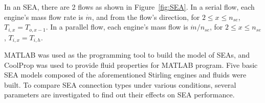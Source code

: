 In an SEA, there are 2 flows as shown in Figure~\ref{fig:SEA}. In a serial flow, each engine's mass flow rate is $\dot{m}$, and from the flow's direction, for $2\leqslant{}x\leqslant{}n_{se}$, $T_{i,x} = T_{o,x-1}$. In a parallel flow, each engine's mass flow is $\dot{m}/n_{se}$, for $2\leqslant{}x\leqslant{}n_{se}$, $T_{i,x} = T_{i,h}$.




MATLAB was used as the programming tool to build the model of SEAs, and CoolProp was used to provide fluid properties for MATLAB program. Five basic SEA models composed of the aforementioned Stirling engines and fluids were built. To compare SEA connection types under various conditions, several parameters are investigated to find out their effects on SEA performance.

%

